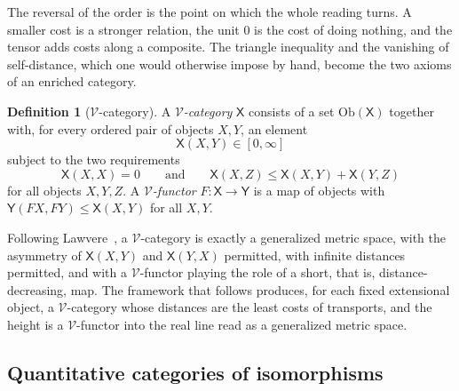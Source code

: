 \documentclass[10pt, reqno]{amsart}
\theoremstyle{plain}
\theoremstyle{definition}
\newtheorem{definition}[theorem]{Definition}
\theoremstyle{plain}
\begin{document}
The reversal of the order is the point on which the whole reading turns. A smaller cost is a stronger relation, the unit $0$ is the cost of doing nothing, and the tensor adds costs along a composite. The triangle inequality and the vanishing of self-distance, which one would otherwise impose by hand, become the two axioms of an enriched category.

\begin{definition}[$\mathcal{V}$-category]\label{def:VCategory}
A \emph{$\mathcal{V}$-category} $\mathsf{X}$ consists of a set $\mathrm{Ob}(\mathsf{X})$ together with, for every ordered pair of objects $X,Y$, an element
\[
  \mathsf{X}(X,Y) \in [0,\infty]
\]
subject to the two requirements
\[
  \mathsf{X}(X,X) = 0
  \qquad\text{and}\qquad
  \mathsf{X}(X,Z) \le \mathsf{X}(X,Y) + \mathsf{X}(Y,Z)
\]
for all objects $X,Y,Z$. A \emph{$\mathcal{V}$-functor} $F \colon \mathsf{X} \to \mathsf{Y}$ is a map of objects with $\mathsf{Y}(FX,FY) \le \mathsf{X}(X,Y)$ for all $X,Y$.
\end{definition}

Following Lawvere~\cite{Lawvere1973}, a $\mathcal{V}$-category is exactly a generalized metric space, with the asymmetry of $\mathsf{X}(X,Y)$ and $\mathsf{X}(Y,X)$ permitted, with infinite distances permitted, and with a $\mathcal{V}$-functor playing the role of a short, that is, distance-decreasing, map. The framework that follows produces, for each fixed extensional object, a $\mathcal{V}$-category whose distances are the least costs of transports, and the height is a $\mathcal{V}$-functor into the real line read as a generalized metric space.

\subsection{Quantitative categories of isomorphisms}
\end{document}
